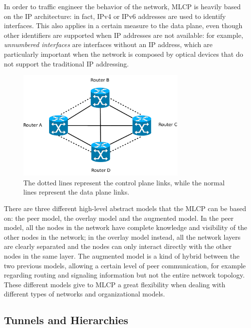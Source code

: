 \documentclass[10pt,a4paper]{report}
\begin{document}
In order to traffic engineer the behavior of the network, MLCP is
heavily based on the IP architecture: in fact, IPv4 or IPv6 addresses
are used to identify interfaces. This also applies in a certain
measure to the data plane, even though other identifiers are supported
when IP addresses are not available: for example, \textit{unnumbered
  interfaces} are interfaces without an IP address, which are
particularly important when the network is composed by optical devices
that do not support the traditional IP addressing.

\begin{figure}[!htbp]
  \centering
  \includegraphics[width=0.75\textwidth]{img/gmpls_mlcp}
  \caption[Control and data links]{The dotted lines represent the
    control plane links, while the normal lines represent the data
    plane links.}
  \label{fig:gmpls_mlcp}
\end{figure}

There are three different high-level abstract models that the MLCP can
be based on: the peer model, the overlay model and the augmented
model. In the peer model, all the nodes in the network have complete
knowledge and visibility of the other nodes in the network; in the
overlay model instead, all the network layers are clearly separated
and the nodes can only interact directly with the other nodes in the
same layer. The augmented model is a kind of hybrid between the two
previous models, allowing a certain level of peer communication, for
example regarding routing and signaling information but not the entire
network topology. These different models give to MLCP a great
flexibility when dealing with different types of networks and
organizational models.

\subsection{Tunnels and Hierarchies}
\end{document}
